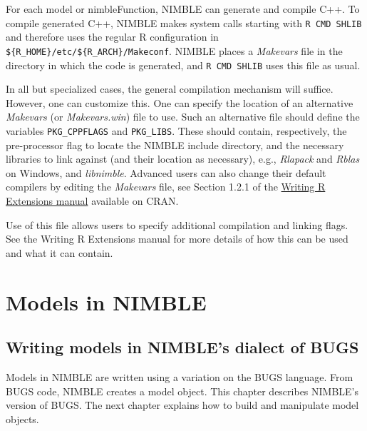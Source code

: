 \documentclass[12pt,oneside]{book}\usepackage[]{graphicx}\usepackage[]{color}
\def\file#1{\textsl{#1}}
\def\cd#1{\texttt{#1}}
\def\nm#1{\textit{#1}}
\begin{document}
For each model or nimbleFunction, NIMBLE can generate and compile C++.
To compile generated C++, NIMBLE makes system calls starting with
\cd{R CMD SHLIB} and therefore uses the regular R configuration in
\verb|${R_HOME}/etc/${R_ARCH}/Makeconf|. NIMBLE places a
\file{Makevars} file in the directory in which the code is generated,
and \verb|R CMD SHLIB| uses this file as usual.

In all but specialized cases, the general compilation mechanism will
suffice. However, one can customize this.  One can specify the
location of an alternative \file{Makevars} (or \file{Makevars.win})
file to use.  Such an alternative file should define the variables \cd{PKG\_CPPFLAGS} and
\cd{PKG\_LIBS}.  These should contain, respectively, the pre-processor flag
to locate the NIMBLE include directory, and the necessary
libraries to link against (and their location as necessary),
e.g., \nm{Rlapack} and \nm{Rblas} on Windows, and \nm{libnimble}.
Advanced users can also change their default compilers by editing the
\nm{Makevars} file, see Section 1.2.1 of the \href{https://cran.r-project.org/doc/manuals/r-release/R-exts.html}{Writing R Extensions manual} available on CRAN.


Use of this file allows users to specify additional compilation and
linking flags.  See the Writing R Extensions manual for more details
of how this can be used and what it can contain.

\part{Models in NIMBLE}
\label{part:models}







\chapter{Writing models in NIMBLE's dialect of BUGS}
\label{cha:writing-models}

Models in NIMBLE are written using a variation on the BUGS language.
From BUGS code, NIMBLE  creates a model object.  This chapter
describes NIMBLE's version of BUGS.  The next chapter explains how to
build and manipulate model objects.


\end{document}
